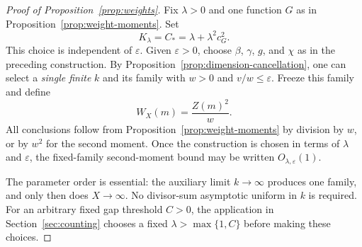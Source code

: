 \begin{proof}[Proof of Proposition~\ref{prop:weights}]
Fix $\lambda>0$ and one function $G$ as in
Proposition~\ref{prop:weight-moments}. Set
\[
 K_\lambda=C_*=\lambda+\lambda^2c_G^2.
\]
This choice is independent of $\varepsilon$. Given $\varepsilon>0$,
choose $\beta$, $\gamma$, $g$, and $\chi$ as in the preceding construction.
By Proposition~\ref{prop:dimension-cancellation}, one can select a
\emph{single finite} $k$ and its family with $w>0$ and
$v/w\le\varepsilon$.  Freeze this family and define
\[
 W_X(m)=\frac{Z(m)^2}{w}.
\]
All conclusions follow from Proposition~\ref{prop:weight-moments} by
division by $w$, or by $w^2$ for the second moment.  Once the construction
is chosen in terms of $\lambda$ and $\varepsilon$, the fixed-family
second-moment bound may be written $O_{\lambda,\varepsilon}(1)$.

The parameter order is essential: the auxiliary limit $k\to\infty$
produces one family, and only then does $X\to\infty$.  No divisor-sum
asymptotic uniform in $k$ is required.  For an arbitrary fixed gap
threshold $C>0$, the application in Section~\ref{sec:counting} chooses a fixed
$\lambda>\max\{1,C\}$ before making these choices.
\end{proof}
